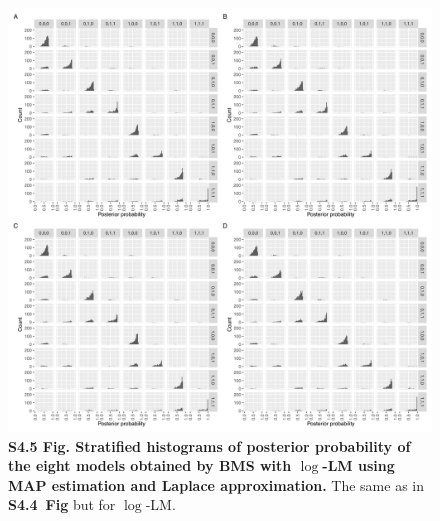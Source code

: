 \documentclass[11pt]{article}
\newcommand{\sfighistmapnl}{\textbf{S4.4~Fig}\xspace}
\begin{document}
\begin{figure}[!ht]
\begin{center}
  \includegraphics[width=1\textwidth]{png/sim_hist_map_lap_lm.png}
\end{center}  
\caption{
  {\bf
    S4.5 Fig.
    Stratified histograms of posterior probability of the eight models obtained by BMS with $\log$-LM using MAP estimation and Laplace approximation.}
The same as in \sfighistmapnl but for $\log$-LM.
}
\label{s-fig:sim-hist-map-lm}
\end{figure}
\end{document}

